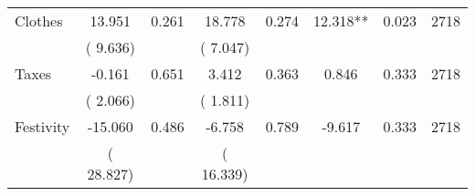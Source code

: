 \begin{tabular}{l*{7}{c}}
 Clothes       &             13.951       &        0.261  &             18.778       &        0.274  &             12.318**       &              0.023 &  2718 \\ 
                       &       (       9.636)             &                               &       (       7.047)                     &                               &                                               &                                &                      \\ 

 Taxes       &             -0.161       &        0.651  &              3.412       &        0.363  &              0.846       &              0.333 &  2718 \\ 
                       &       (       2.066)             &                               &       (       1.811)                     &                               &                                               &                                &                      \\ 

 Festivity       &            -15.060       &        0.486  &             -6.758       &        0.789  &             -9.617       &              0.333 &  2718 \\ 
                       &       (      28.827)             &                               &       (      16.339)                     &                               &                                               &                                &                      \\ 

\hline \end{tabular}